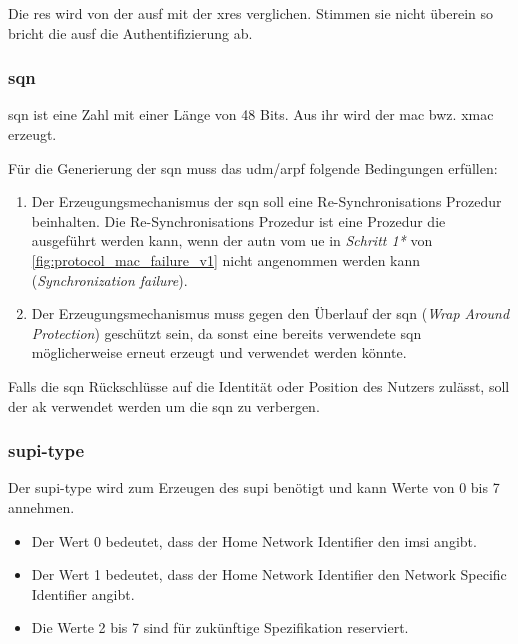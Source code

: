 Die \gls{res} wird von der \gls{ausf} mit der \gls{xres} verglichen.
Stimmen sie nicht überein so bricht die \gls{ausf} die Authentifizierung ab. %

\subsubsection{\gls{sqn}}
\gls{sqn} ist eine Zahl mit einer Länge von 48 Bits. %
Aus ihr wird der \gls{mac} bwz. \gls{xmac} erzeugt. %

Für die Generierung der \gls{sqn} muss das \gls{udm}/\gls{arpf} folgende Bedingungen erfüllen:\\%
\begin{enumerate}
\item Der Erzeugungsmechanismus der \gls{sqn} soll eine Re-Synchronisations Prozedur beinhalten.
Die Re-Synchronisations Prozedur ist eine Prozedur die ausgeführt werden kann, wenn der \gls{autn} vom \gls{ue} in \textit{Schritt 1*} von \cref{fig:protocol_mac_failure_v1} nicht angenommen werden kann (\textit{Synchronization failure}).
\item Der Erzeugungsmechanismus muss gegen den Überlauf der \gls{sqn} (\textit{Wrap Around Protection}) geschützt sein, da sonst eine bereits verwendete \gls{sqn} möglicherweise erneut erzeugt und verwendet werden könnte. 
\end{enumerate}

Falls die \gls{sqn} Rückschlüsse auf die Identität oder Position des Nutzers zulässt, soll der \gls{ak} verwendet werden um die \gls{sqn} zu verbergen.

\subsubsection{\gls{supi-type}}
Der \gls{supi-type} wird zum Erzeugen des \gls{supi} benötigt und kann Werte von 0 bis 7 annehmen. %
\begin{itemize}
\item Der Wert 0 bedeutet, dass der Home Network Identifier den \gls{imsi} angibt.
\item Der Wert 1 bedeutet, dass der Home Network Identifier den Network Specific Identifier angibt.
\item Die Werte 2 bis 7 sind für zukünftige Spezifikation reserviert.
\end{itemize}

